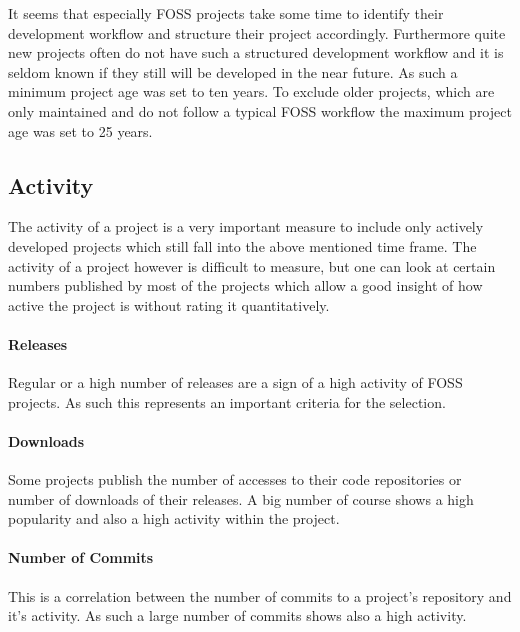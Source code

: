 It seems that especially \ac{FOSS} projects take some time to identify their
development workflow and structure their project accordingly. Furthermore quite
new projects often do not have such a structured development workflow and it is
seldom known if they still will be developed in the near future. As such a
minimum project age was set to ten years. To exclude older projects, which are
only maintained and do not follow a typical \ac{FOSS} workflow the maximum
project age was set to 25 years.


\subsection{Activity} %

The activity of a project is a very important measure to include only actively
developed projects which still fall into the above mentioned time frame. The
activity of a project however is difficult to measure, but one can look at
certain numbers published by most of the projects which allow a good insight of
how active the project is without rating it quantitatively.

\paragraph{Releases} %

Regular or a high number of releases are a sign of a high activity of \ac{FOSS}
projects. As such this represents an important criteria for the selection.


\paragraph{Downloads} %

Some projects publish the number of accesses to their code repositories or
number of downloads of their releases. A big number of course shows a high
popularity and also a high activity within the project.


\paragraph{Number of Commits} %

This is a correlation between the number of commits to a project's repository
and it's activity. As such a large number of commits shows also a high
activity.


